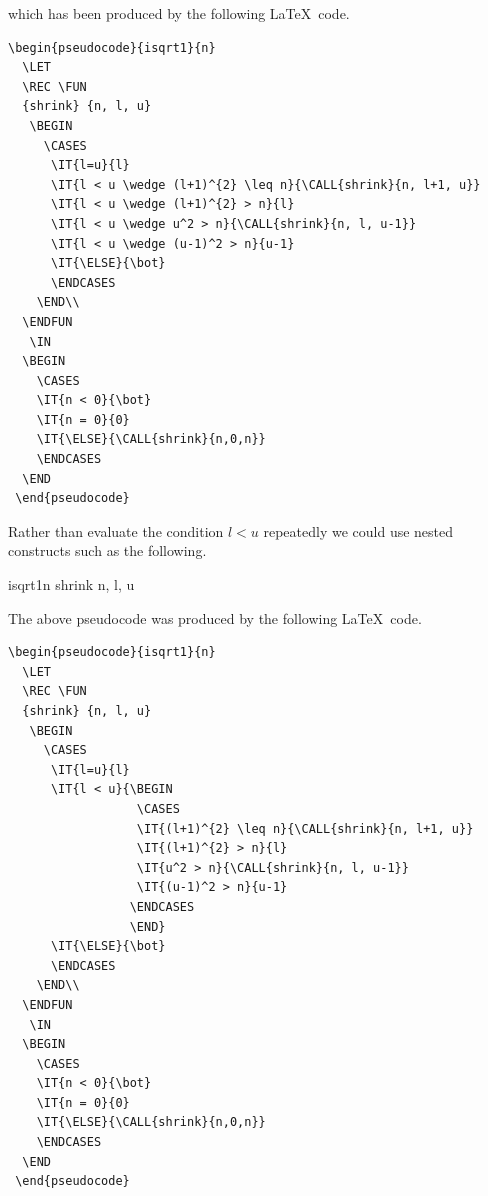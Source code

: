\documentclass[a4]{article}
\begin{document}
\noindent{}which has been produced by the following \LaTeX\ code.

\begin{verbatim}
\begin{pseudocode}{isqrt1}{n}
  \LET 
  \REC \FUN
  {shrink} {n, l, u}
   \BEGIN
     \CASES
      \IT{l=u}{l}
      \IT{l < u \wedge (l+1)^{2} \leq n}{\CALL{shrink}{n, l+1, u}}
      \IT{l < u \wedge (l+1)^{2} > n}{l}
      \IT{l < u \wedge u^2 > n}{\CALL{shrink}{n, l, u-1}}
      \IT{l < u \wedge (u-1)^2 > n}{u-1}
      \IT{\ELSE}{\bot}
      \ENDCASES
    \END\\
  \ENDFUN
   \IN
  \BEGIN
    \CASES
    \IT{n < 0}{\bot}
    \IT{n = 0}{0}
    \IT{\ELSE}{\CALL{shrink}{n,0,n}}
    \ENDCASES
  \END
 \end{pseudocode}  
\end{verbatim}

Rather than evaluate the condition $l < u$ repeatedly we could use
nested constructs such as the following.

\begin{pseudocode}{isqrt1}{n}
  \LET 
  \REC \FUN
  {shrink} {n, l, u}
   \BEGIN
     \CASES
      \IT{\ELSE}{\bot}
      \ENDCASES
    \END\\
  \ENDFUN
   \IN
  \BEGIN
    \CASES
    \ENDCASES
  \END
 \end{pseudocode}  

The above pseudocode was produced by the following \LaTeX\ code.

\begin{verbatim}
\begin{pseudocode}{isqrt1}{n}
  \LET 
  \REC \FUN
  {shrink} {n, l, u}
   \BEGIN
     \CASES
      \IT{l=u}{l}
      \IT{l < u}{\BEGIN
                  \CASES
                  \IT{(l+1)^{2} \leq n}{\CALL{shrink}{n, l+1, u}}
                  \IT{(l+1)^{2} > n}{l}
                  \IT{u^2 > n}{\CALL{shrink}{n, l, u-1}}
                  \IT{(u-1)^2 > n}{u-1}
                 \ENDCASES
                 \END}
      \IT{\ELSE}{\bot}
      \ENDCASES
    \END\\
  \ENDFUN
   \IN
  \BEGIN
    \CASES
    \IT{n < 0}{\bot}
    \IT{n = 0}{0}
    \IT{\ELSE}{\CALL{shrink}{n,0,n}}
    \ENDCASES
  \END
 \end{pseudocode}  
\end{verbatim}
\end{document}

